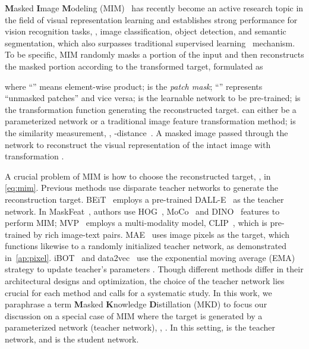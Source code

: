 \documentclass[10pt,twocolumn,letterpaper]{article}
\begin{document}
\textbf{M}asked \textbf{I}mage \textbf{M}odeling (MIM)~\cite{mae,maskfeat, baevski2022data2vec, zhou2021ibot} has recently become an active research topic in the field of visual representation learning and establishes strong performance for vision recognition tasks, \eg, image classification, object detection, and semantic segmentation, which also surpasses traditional supervised learning~\cite{deit} mechanism.
To be specific, MIM randomly masks a portion of the input and then reconstructs the masked portion according to the transformed target, formulated as

where ``'' means element-wise product;  is the \emph{patch mask}; ``'' represents ``unmasked patches'' and vice versa; 
 is the learnable network to be pre-trained; 
 is the transformation function generating the reconstructed target.  can either be a parameterized network or a traditional image feature transformation method;
 is the similarity measurement, \eg, -distance~\cite{mae}. A masked image passed through the network  to reconstruct the visual representation of the intact image with transformation . 

A crucial problem of MIM is how to choose the reconstructed target, \ie,  in \cref{eq:mim}.
Previous methods use disparate teacher networks to generate the reconstruction target.
BEiT~\cite{beit} employs a pre-trained DALL-E~\cite{dall-e} as the teacher network. 
In MaskFeat~\cite{maskfeat}, authors use HOG~\cite{hog}, MoCo~\cite{moco} and DINO~\cite{dino} features to perform MIM; 
MVP~\cite{wei2022mvp} employs a multi-modality model, CLIP~\cite{clip}, which is pre-trained by rich image-text pairs. 
MAE~\cite{mae} uses image pixels as the target, which functions likewise to a randomly initialized teacher network, as demonstrated in~\cref{ap:pixel}.
iBOT~\cite{zhou2021ibot} and data2vec~\cite{baevski2022data2vec} use the exponential moving average (EMA) strategy to update teacher's parameters .
Though different methods differ in their architectural designs and optimization, the choice of the teacher network lies crucial for each method and calls for a systematic study.
In this work, we paraphrase a term \textbf{M}asked \textbf{K}nowledge \textbf{D}istillation (MKD) to focus our discussion on a special case of MIM where the target is generated by a parameterized network (teacher network), \ie, .
In this setting,  is the teacher network, and  is the student network.
\end{document}
